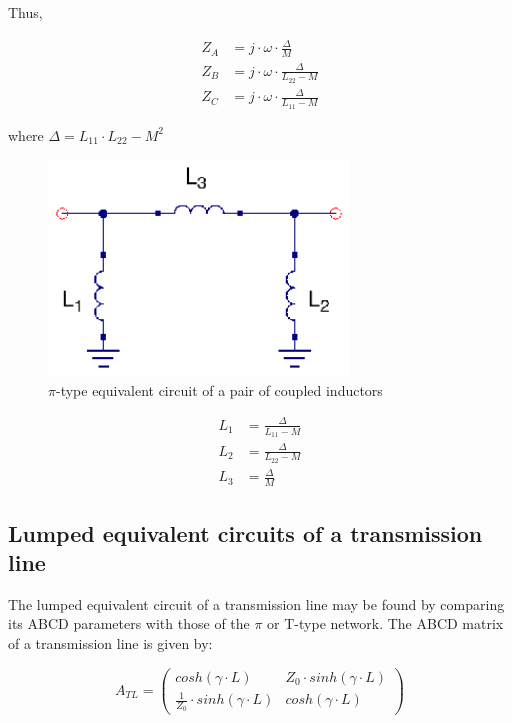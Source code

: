 \noindent Thus,

\begin{align}
   Z_A &= j \cdot \omega \cdot \frac{\Delta}{M} \\
   Z_B &= j \cdot \omega \cdot \frac{\Delta}{L_{22} - M} \\
   Z_C &= j \cdot \omega \cdot \frac{\Delta}{L_{11} - M}
\end{align}

\noindent where $\Delta = L_{11} \cdot L_{22} - M^2$

\begin{figure}[H]
\centering
\includegraphics[width=80mm]{coupled-inductors-pi-equivalent}
\caption{$\pi$-type equivalent circuit of a pair of coupled inductors}
\label{fig:pi-type-coupled-inductor-equivalent}
\end{figure}


\begin{align}
   L_1 &= \frac{\Delta}{L_{11} - M} \\
   L_2 &= \frac{\Delta}{L_{22} - M} \\
   L_3 &= \frac{\Delta}{M}
\end{align}

\subsection{Lumped equivalent circuits of a transmission line}

\noindent The lumped equivalent circuit of a transmission line may be found by comparing its ABCD parameters with those of the $\pi$ or T-type network. The ABCD matrix of a transmission line is given by:

\begin{equation}
A_{TL} = \begin{pmatrix}
    cosh(\gamma \cdot L)       & Z_0 \cdot sinh(\gamma \cdot L) \\
    \frac{1}{Z_0} \cdot sinh(\gamma \cdot L) & cosh(\gamma \cdot L)
\end{pmatrix}
\end{equation}

